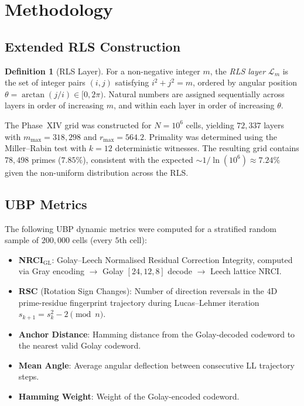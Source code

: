 \documentclass[11pt,a4paper]{article}
\theoremstyle{definition}
\newtheorem{definition}{Definition}[section]
\begin{document}
\section{Methodology}
\label{sec:method}

\subsection{Extended RLS Construction}

\begin{definition}[RLS Layer]
For a non-negative integer $m$, the \emph{RLS layer} $\mathcal{L}_m$ is the set
of integer pairs $(i, j)$ satisfying $i^2 + j^2 = m$, ordered by angular
position $\theta = \arctan(j/i) \in [0, 2\pi)$.  Natural numbers are assigned
sequentially across layers in order of increasing $m$, and within each layer
in order of increasing $\theta$.
\end{definition}

The Phase~XIV grid was constructed for $N = 10^6$ cells, yielding $72{,}337$
layers with $m_{\max} = 318{,}298$ and $r_{\max} = 564.2$.  Primality was
determined using the Miller--Rabin test with $k = 12$ deterministic witnesses.
The resulting grid contains $78{,}498$ primes ($7.85\%$), consistent with the
expected $\sim 1/\ln(10^6) \approx 7.24\%$ given the non-uniform distribution
across the RLS.

\subsection{UBP Metrics}

The following UBP dynamic metrics were computed for a stratified random sample
of $200{,}000$ cells (every $5$th cell):

\begin{itemize}
    \item \textbf{NRCI$_{\text{GL}}$}: Golay--Leech Normalised Residual Correction
          Integrity, computed via Gray encoding $\to$ Golay $[24,12,8]$ decode
          $\to$ Leech lattice NRCI.
    \item \textbf{RSC} (Rotation Sign Changes): Number of direction reversals in
          the $4$D prime-residue fingerprint trajectory during Lucas--Lehmer
          iteration $s_{k+1} = s_k^2 - 2 \pmod{n}$.
    \item \textbf{Anchor Distance}: Hamming distance from the Golay-decoded
          codeword to the nearest valid Golay codeword.
    \item \textbf{Mean Angle}: Average angular deflection between consecutive
          LL trajectory steps.
    \item \textbf{Hamming Weight}: Weight of the Golay-encoded codeword.
\end{itemize}
\end{document}
